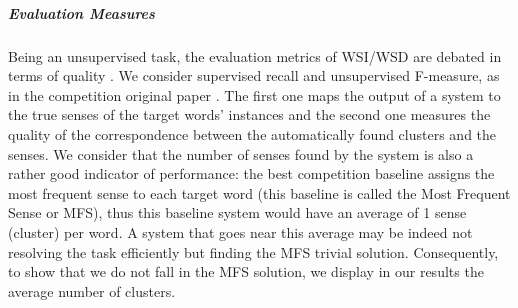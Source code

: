 % 


\subparagraph{Evaluation Measures}
Being an unsupervised task, the evaluation metrics of WSI/WSD are debated in terms of quality \cite{CruysA11}. We consider supervised recall and unsupervised F-measure, as in the competition original paper \cite{Agirre2007}. The first one maps the output of a system to the true senses of the target words' instances and the second one measures the quality of the correspondence between the automatically found clusters and the senses. 
We consider that the number of senses found by the system is also a rather good indicator of performance: the best competition baseline assigns the most frequent sense to each target word (this baseline is called the Most Frequent Sense or MFS), thus this baseline system would have an average of 1 sense (cluster) per word. A system that goes near this average may be indeed not resolving the task efficiently but finding the MFS trivial solution. Consequently, to show that we do not fall in the MFS solution, we display in our results the average number of clusters.




